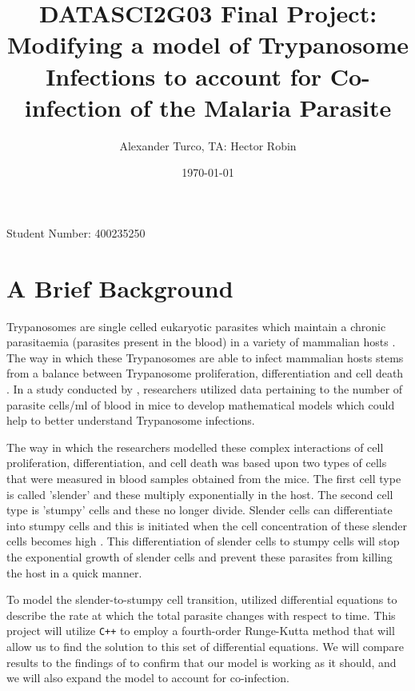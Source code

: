 \documentclass[11pt]{article}
\title{ DATASCI2G03 Final Project: Modifying a model of Trypanosome Infections to account for Co-infection of the Malaria Parasite  }
\author{ Alexander Turco, TA: Hector Robin  }
\date{\today}
\begin{document}
	
	\maketitle
	\vspace{-1cm}
	\begin{center}
		Student Number: 400235250
	\end{center}
	
	\pagebreak
	
	 \tableofcontents
	 \pagebreak
	
	\section{A Brief Background}
	
	Trypanosomes are single celled eukaryotic parasites which maintain a chronic parasitaemia (parasites present in the blood) in a variety of mammalian hosts \citep{tyler2001limitation}. The way in which these Trypanosomes are able to infect mammalian hosts stems from a balance between Trypanosome proliferation, differentiation and cell death \citep{tyler2001limitation}. In a study conducted by \citep{tyler2001limitation}, researchers utilized data pertaining to the number of parasite cells/ml of blood in mice to develop mathematical models which could help to better understand Trypanosome infections.
	
	The way in which the researchers modelled these complex interactions of cell proliferation, differentiation, and cell death was based upon two types of cells that were measured in blood samples obtained from the mice. The first cell type is called 'slender' and these multiply exponentially in the host. The second cell type is 'stumpy' cells and these no longer divide. Slender cells can differentiate into stumpy cells and this is initiated when the cell concentration of these slender cells becomes high \citep{tyler2001limitation}. This differentiation of slender cells to stumpy cells will stop the exponential growth of slender cells and prevent these parasites from killing the host in a quick manner.
	
	To model the slender-to-stumpy cell transition, \citep{tyler2001limitation} utilized differential equations to describe the rate at which the total parasite changes with respect to time. This project will utilize \texttt{C++} to employ a fourth-order Runge-Kutta method that will allow us to find the solution to this set of differential equations. We will compare results to the findings of \citep{tyler2001limitation} to confirm that our model is working as it should, and we will also expand the model to account for co-infection.
	
\end{document}
